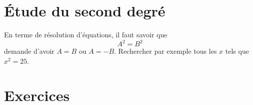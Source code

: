 \section{Étude du second degré}

En terme de résolution d'équations, il faut savoir que
\begin{equation}
    A^2=B^2
\end{equation}
demande d'avoir \( A=B\) ou \( A=-B\). Rechercher par exemple tous les \( x\) tels que \( x^2=25\).

\section{Exercices}

